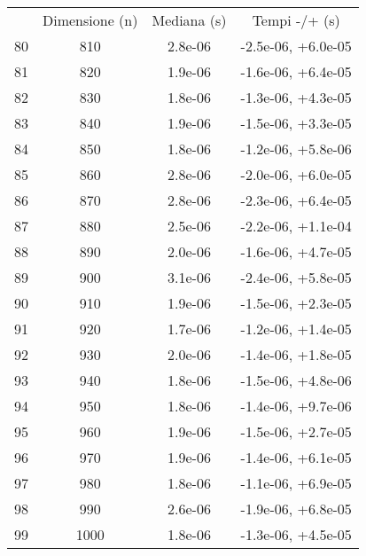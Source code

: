 \begin{table}
\centering
\begin{adjustbox}{width=1\textwidth/2}
\begin{tabular}{|c|c|c|c|}
\hline
 & Dimensione (n) & Mediana (s) & Tempi -/+ (s) \\
80 & 810 & 2.8e-06 & -2.5e-06, +6.0e-05 \\
\cline{1-4}
81 & 820 & 1.9e-06 & -1.6e-06, +6.4e-05 \\
\cline{1-4}
82 & 830 & 1.8e-06 & -1.3e-06, +4.3e-05 \\
\cline{1-4}
83 & 840 & 1.9e-06 & -1.5e-06, +3.3e-05 \\
\cline{1-4}
84 & 850 & 1.8e-06 & -1.2e-06, +5.8e-06 \\
\cline{1-4}
85 & 860 & 2.8e-06 & -2.0e-06, +6.0e-05 \\
\cline{1-4}
86 & 870 & 2.8e-06 & -2.3e-06, +6.4e-05 \\
\cline{1-4}
87 & 880 & 2.5e-06 & -2.2e-06, +1.1e-04 \\
\cline{1-4}
88 & 890 & 2.0e-06 & -1.6e-06, +4.7e-05 \\
\cline{1-4}
89 & 900 & 3.1e-06 & -2.4e-06, +5.8e-05 \\
\cline{1-4}
90 & 910 & 1.9e-06 & -1.5e-06, +2.3e-05 \\
\cline{1-4}
91 & 920 & 1.7e-06 & -1.2e-06, +1.4e-05 \\
\cline{1-4}
92 & 930 & 2.0e-06 & -1.4e-06, +1.8e-05 \\
\cline{1-4}
93 & 940 & 1.8e-06 & -1.5e-06, +4.8e-06 \\
\cline{1-4}
94 & 950 & 1.8e-06 & -1.4e-06, +9.7e-06 \\
\cline{1-4}
95 & 960 & 1.9e-06 & -1.5e-06, +2.7e-05 \\
\cline{1-4}
96 & 970 & 1.9e-06 & -1.4e-06, +6.1e-05 \\
\cline{1-4}
97 & 980 & 1.8e-06 & -1.1e-06, +6.9e-05 \\
\cline{1-4}
98 & 990 & 2.6e-06 & -1.9e-06, +6.8e-05 \\
\cline{1-4}
99 & 1000 & 1.8e-06 & -1.3e-06, +4.5e-05 \\
\cline{1-4}
\end{tabular}
\end{adjustbox}
\end{table}

